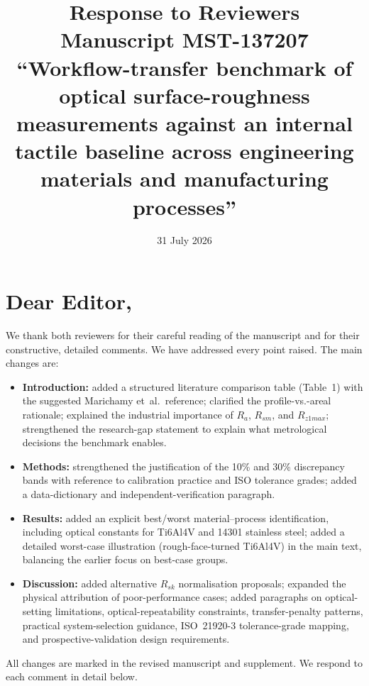 \documentclass[10pt]{article}
\begin{document}
\title{Response to Reviewers \\
Manuscript MST-137207 \\
{\normalsize ``Workflow-transfer benchmark of optical surface-roughness measurements against an internal tactile baseline across engineering materials and manufacturing processes''}}

\date{31 July 2026}
\maketitle

\section*{Dear Editor,}

We thank both reviewers for their careful reading of the manuscript and for their constructive, detailed comments. We have addressed every point raised. The main changes are:

\begin{itemize}
    \item \textbf{Introduction:} added a structured literature comparison table (Table~1) with the suggested Marichamy et~al.\ reference; clarified the profile-vs.-areal rationale; explained the industrial importance of $R_a$, $R_{sm}$, and $R_{z1max}$; strengthened the research-gap statement to explain what metrological decisions the benchmark enables.
    \item \textbf{Methods:} strengthened the justification of the 10\% and 30\% discrepancy bands with reference to calibration practice and ISO tolerance grades; added a data-dictionary and independent-verification paragraph.
    \item \textbf{Results:} added an explicit best/worst material--process identification, including optical constants for Ti6Al4V and 14301 stainless steel; added a detailed worst-case illustration (rough-face-turned Ti6Al4V) in the main text, balancing the earlier focus on best-case groups.
    \item \textbf{Discussion:} added alternative $R_{sk}$ normalisation proposals; expanded the physical attribution of poor-performance cases; added paragraphs on optical-setting limitations, optical-repeatability constraints, transfer-penalty patterns, practical system-selection guidance, ISO~21920-3 tolerance-grade mapping, and prospective-validation design requirements.
\end{itemize}

All changes are marked in the revised manuscript and supplement. We respond to each comment in detail below.
\end{document}
